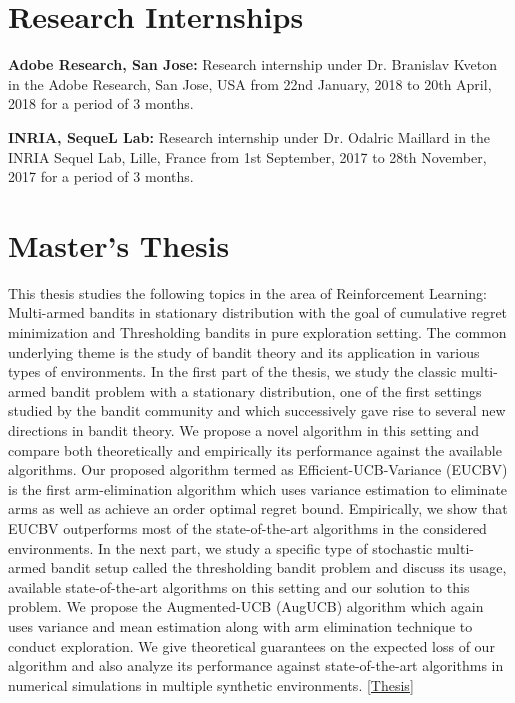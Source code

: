 \documentclass[margin,11pt]{res}
\begin{document}
\begin{resume}

\section{Research Internships}
\textbf{Adobe Research, San Jose:} Research internship under Dr. Branislav Kveton in the Adobe Research, San Jose, USA from 22nd January, 2018 to 20th April, 2018 for a period of 3 months.

\textbf{INRIA, SequeL Lab:} Research internship under Dr. Odalric Maillard in the INRIA Sequel Lab, Lille, France from 1st September, 2017 to 28th November, 2017 for a period of 3 months.




\section{Master's Thesis}

This thesis studies the following topics in the area of Reinforcement Learning: Multi-armed bandits in stationary distribution with the goal of cumulative regret minimization and Thresholding bandits in pure exploration setting. The common underlying theme is the study of bandit theory and its application in various types of environments. In the first part of the thesis, we study the classic multi-armed bandit problem with a stationary distribution, one of the first settings studied by the bandit community and which successively gave rise to several new directions in bandit theory. We propose a novel algorithm in this setting and compare both theoretically and empirically its performance against the available algorithms. Our proposed algorithm termed as Efficient-UCB-Variance (EUCBV) is the first arm-elimination algorithm which uses variance estimation to eliminate arms as well as achieve an order optimal regret bound. Empirically, we show that EUCBV outperforms most of the state-of-the-art algorithms in the considered environments. In the next part, we study a specific type of stochastic multi-armed bandit setup called the thresholding bandit problem and discuss its usage, available state-of-the-art algorithms on this setting and our solution to this problem. We propose the Augmented-UCB (AugUCB) algorithm which again uses variance and mean estimation along with arm elimination technique to conduct exploration. We give theoretical guarantees on the expected loss of our algorithm and also analyze its performance against state-of-the-art algorithms in numerical simulations in multiple synthetic environments. \href{https://subhojyoti.github.io/pdf/final_thesis(A5)_Subhojyoti_CS15S300.pdf}{[Thesis]}



\end{resume}
\end{document}
